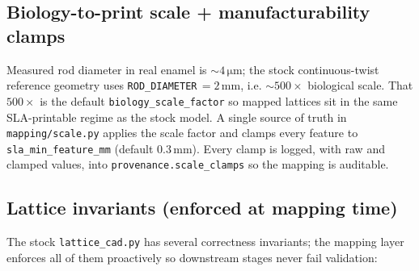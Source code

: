 \documentclass[11pt, letterpaper]{article}
\begin{document}
\subsection{Biology-to-print scale + manufacturability clamps}
Measured rod diameter in real enamel is $\sim 4\,\si{\micro\meter}$; the stock continuous-twist reference geometry uses \texttt{ROD\_DIAMETER}\,$=2$\,mm, i.e. $\sim 500\times$ biological scale. That $500\times$ is the default \texttt{biology\_scale\_factor} so mapped lattices sit in the same SLA-printable regime as the stock model. A single source of truth in \texttt{mapping/scale.py} applies the scale factor and clamps every feature to \texttt{sla\_min\_feature\_mm} (default $0.3$\,mm). Every clamp is logged, with raw and clamped values, into \texttt{provenance.scale\_clamps} so the mapping is auditable.

\subsection{Lattice invariants (enforced at mapping time)}
The stock \texttt{lattice\_cad.py} has several correctness invariants; the mapping layer enforces all of them proactively so downstream stages never fail validation:
\end{document}
